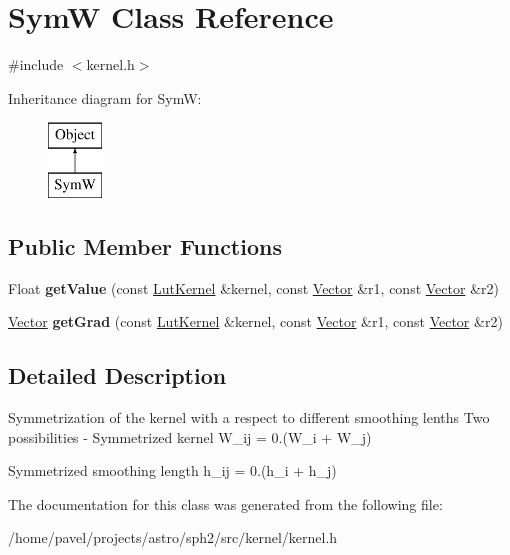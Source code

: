 \hypertarget{classSymW}{}\section{SymW Class Reference}
\label{classSymW}


{\ttfamily \#include $<$kernel.\+h$>$}

Inheritance diagram for SymW\+:\begin{figure}[H]
\begin{center}
\leavevmode
\includegraphics[height=2.000000cm]{classSymW}
\end{center}
\end{figure}
\subsection*{Public Member Functions}
\begin{DoxyCompactItemize}
\item 
\hypertarget{classSymW_ac427374b08d16649dfbc3957b8f69e42}{}\label{classSymW_ac427374b08d16649dfbc3957b8f69e42} 
Float {\bfseries get\+Value} (const \hyperlink{classLutKernel}{Lut\+Kernel} \&kernel, const \hyperlink{classBasicVector}{Vector} \&r1, const \hyperlink{classBasicVector}{Vector} \&r2)
\item 
\hypertarget{classSymW_ae936af6504d465ae10be293ed8d35546}{}\label{classSymW_ae936af6504d465ae10be293ed8d35546} 
\hyperlink{classBasicVector}{Vector} {\bfseries get\+Grad} (const \hyperlink{classLutKernel}{Lut\+Kernel} \&kernel, const \hyperlink{classBasicVector}{Vector} \&r1, const \hyperlink{classBasicVector}{Vector} \&r2)
\end{DoxyCompactItemize}


\subsection{Detailed Description}
Symmetrization of the kernel with a respect to different smoothing lenths Two possibilities -\/ Symmetrized kernel W\+\_\+ij = 0.(W\+\_\+i + W\+\_\+j)
\begin{DoxyItemize}
\item Symmetrized smoothing length h\+\_\+ij = 0.(h\+\_\+i + h\+\_\+j) 
\end{DoxyItemize}

The documentation for this class was generated from the following file\+:\begin{DoxyCompactItemize}
\item 
/home/pavel/projects/astro/sph2/src/kernel/kernel.\+h\end{DoxyCompactItemize}

